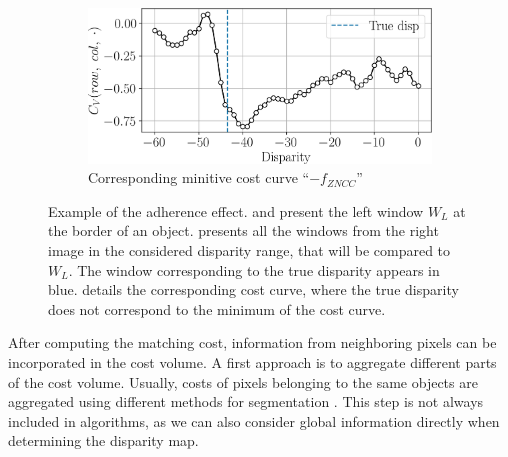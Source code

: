 \begin{figure}
    \begin{subfigure}[t]{\linewidth}
        \centering
        \includegraphics[width=\linewidth]{Images/Chap_1/adherence_cost_curve.png}
        \caption{Corresponding minitive cost curve ``$-f_{ZNCC}$''}
        \label{fig:adherence_cost_curve}
    \end{subfigure}
    \caption{Example of the adherence effect.  and  present the left window $W_L$ at the border of an object.  presents all the windows from the right image in the considered disparity range, that will be compared to $W_L$. The window corresponding to the true disparity appears in blue.  details the corresponding cost curve, where the true disparity does not correspond to the minimum of the cost curve.}
    \label{fig:adherence_window}
\end{figure}

After computing the matching cost, information from neighboring pixels can be incorporated in the cost volume. A first approach is to aggregate different parts of the cost volume. Usually, costs of pixels belonging to the same objects are aggregated using different methods for segmentation \cite{ke_zhang_cross-based_2009, ji_superpixel_2021}. This step is not always included in algorithms, as we can also consider global information directly when determining the disparity map.

